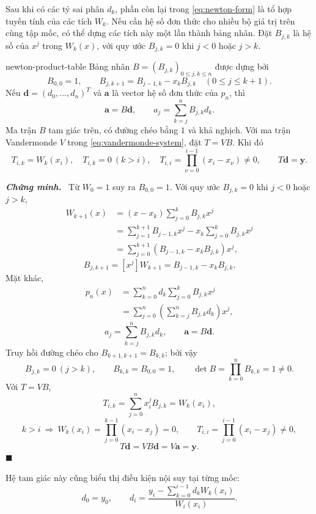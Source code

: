 \documentclass[12pt,a4paper,oneside]{book}
\numberwithin{algorithm}{chapter}
\theoremstyle{definition}
\newenvironment{chungminh}{\par\medskip\noindent\textbf{\textit{\color{mainblue}Chứng minh.}}\ }{\hfill$\blacksquare$\par\medskip}
\begin{document}
Sau khi có các tỷ sai phân $d_k$, phần còn lại trong \eqref{eq:newton-form} là tổ hợp tuyến tính của các tích $W_k$. Nếu cần hệ số đơn thức cho nhiều bộ giá trị trên cùng tập mốc, có thể dựng các tích này một lần thành bảng nhân.
Đặt $B_{j,k}$ là hệ số của $x^j$ trong $W_k(x)$, với quy ước $B_{j,k}=0$ khi $j<0$ hoặc $j>k$.
\begin{menhde}{}{newton-product-table}
Bảng nhân $B=(B_{j,k})_{0\leq j,k\leq n}$ được dựng bởi
\begin{equation}\label{eq:newton-product-table}
 B_{0,0}=1,\qquad
 B_{j,k+1}=B_{j-1,k}-x_kB_{j,k}\quad(0\leq j\leq k+1).
\end{equation}
Nếu $\boldsymbol d=(d_0,\ldots,d_n)^T$ và $\boldsymbol a$ là vector hệ số đơn thức của $p_n$, thì
\begin{equation}\label{eq:newton-matrix-product}
 \boldsymbol a=B\boldsymbol d,\qquad
 a_j=\sum_{k=j}^{n}B_{j,k}d_k.
\end{equation}
Ma trận $B$ tam giác trên, có đường chéo bằng $1$ và khả nghịch. Với ma trận Vandermonde $V$ trong \eqref{eq:vandermonde-system}, đặt $T=VB$. Khi đó
\[
 T_{i,k}=W_k(x_i),\quad T_{i,k}=0\ (k>i),\quad
 T_{i,i}=\prod_{\nu=0}^{i-1}(x_i-x_\nu)\ne0,\qquad
 T\boldsymbol d=\boldsymbol y.
\]
\end{menhde}
\begin{chungminh}
Từ $W_0=1$ suy ra $B_{0,0}=1$. Với quy ước $B_{j,k}=0$ khi $j<0$ hoặc $j>k$,
\begin{align*}
 W_{k+1}(x)
 &=(x-x_k)\sum_{j=0}^{k}B_{j,k}x^j\\
 &=\sum_{j=1}^{k+1}B_{j-1,k}x^j-x_k\sum_{j=0}^{k}B_{j,k}x^j\\
 &=\sum_{j=0}^{k+1}(B_{j-1,k}-x_kB_{j,k})x^j,
\end{align*}
\[
 B_{j,k+1}=[x^j]W_{k+1}=B_{j-1,k}-x_kB_{j,k}.
\]
Mặt khác,
\begin{align*}
 p_n(x)
 &=\sum_{k=0}^{n}d_k\sum_{j=0}^{k}B_{j,k}x^j\\
 &=\sum_{j=0}^{n}\left(\sum_{k=j}^{n}B_{j,k}d_k\right)x^j,
\end{align*}
\[
 a_j=\sum_{k=j}^{n}B_{j,k}d_k,
 \qquad\boldsymbol a=B\boldsymbol d.
\]
Truy hồi đường chéo cho $B_{k+1,k+1}=B_{k,k}$; bởi vậy
\[
 B_{j,k}=0\ (j>k),\qquad B_{k,k}=B_{0,0}=1,
 \qquad\det B=\prod_{k=0}^{n}B_{k,k}=1\ne0.
\]
Với $T=VB$,
\[
 T_{i,k}=\sum_{j=0}^{n}x_i^jB_{j,k}=W_k(x_i),
\]
\[
 k>i\ \Longrightarrow\ W_k(x_i)=\prod_{j=0}^{k-1}(x_i-x_j)=0,
 \qquad T_{i,i}=\prod_{j=0}^{i-1}(x_i-x_j)\ne0,
\]
\[
 T\boldsymbol d=VB\boldsymbol d=V\boldsymbol a=\boldsymbol y.
\]
\end{chungminh}
Hệ tam giác này cũng biểu thị điều kiện nội suy tại từng mốc:
\[
 d_0=y_0,\qquad
 d_i=\frac{y_i-\sum_{k=0}^{i-1}d_kW_k(x_i)}{W_i(x_i)}.
\]
\end{document}
